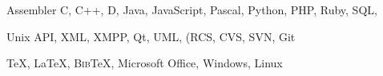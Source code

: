 \documentclass[10pt]{article}
\renewcommand{\subsection}[2]%
        {\pagebreak[2]\vspace{0.3\baselineskip}%
         \phantomsection\addcontentsline{toc}{subsection}{#1}%
         \hspace{0in}%
         \marginpar{\scriptsize
         \raggedright \scshape #1}#2}
\newcommand{\blankline}{\quad\pagebreak[2]}
\begin{document}
\blankline


\blankline

Assembler
C, C++, D, Java, JavaScript, Pascal, Python, PHP, Ruby,
SQL,

\blankline

Unix API,
XML, XMPP, Qt, UML,
(RCS, CVS, SVN, Git

\blankline

\TeX{}, \LaTeX{}, B\textsc{ib}\TeX{}, Microsoft Office,
Windows,
 Linux
\end{document}
